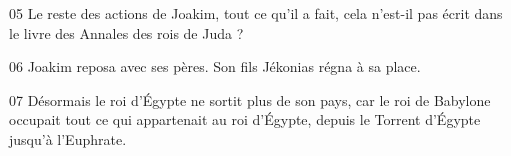 
05 Le reste des actions de Joakim, tout ce qu’il a fait, cela n’est-il pas écrit dans le livre des Annales des rois de Juda ?

06 Joakim reposa avec ses pères. Son fils Jékonias régna à sa place.

07 Désormais le roi d’Égypte ne sortit plus de son pays, car le roi de Babylone occupait tout ce qui appartenait au roi d’Égypte, depuis le Torrent d’Égypte jusqu’à l’Euphrate.